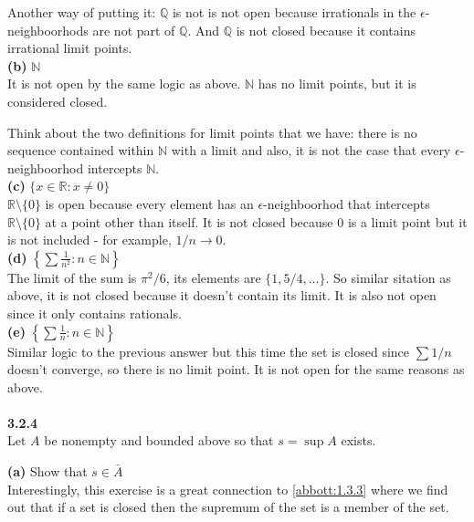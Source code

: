 Another way of putting it: $\mathbb{Q}$ is not is not open because irrationals in the $\epsilon$-neighboorhods
are not part of $\mathbb{Q}$. And $\mathbb{Q}$ is not closed because it contains irrational limit points.
\\

\textbf{(b)} $\mathbb{N}$
\\

It is not open by the same logic as above.
$\mathbb{N}$ has no limit points, but it is considered closed.

Think about the two definitions for limit points that we have: there is no sequence contained within $\mathbb{N}$
with a limit and also, it is not the case that every $\epsilon$-neighboorhod intercepts $\mathbb{N}$.
\\

\textbf{(c)} $\{ x\in\mathbb{R} : x \neq 0 \}$
\\

$\mathbb{R} \setminus \{0\}$ is open because every element has an $\epsilon$-neighboorhod that intercepts
$\mathbb{R} \setminus \{0\}$ at a point other than itself.
It is not closed because 0 is a limit point but it is not included - for example, $1/n \rightarrow 0$.
\\

\textbf{(d)} $\left\{ \sum \frac{1}{n^2} : n\in\mathbb{N} \right\}$
\\

The limit of the sum is $\pi^2 / 6$, its elements are $\{1, 5/4, \ldots \}$.
So similar sitation as above, it is not closed because it doesn't contain its limit.
It is also not open since it only contains rationals.
\\

\textbf{(e)} $\left\{ \sum \frac{1}{n} : n\in\mathbb{N} \right\}$
\\
Similar logic to the previous answer but this time the set is closed since $\sum 1/n$ doesn't converge,
so there is no limit point.
It is not open for the same reasons  as above.
\\~\\




\textbf{3.2.4}
\\

Let $A$ be nonempty and bounded above so that $s = \sup A$ exists.

\textbf{(a)} Show that $s\in \bar{A}$
\\

Interestingly, this exercise is a great connection to \ref{abbott:1.3.3} where we find out that if a set is closed
then the supremum of the set is a member of the set.

